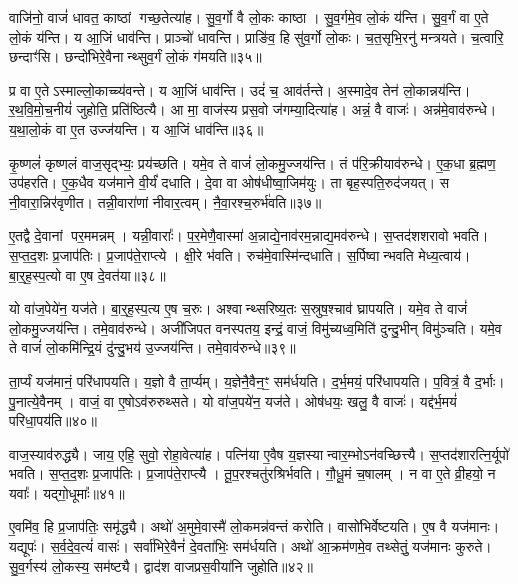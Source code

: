 वाजि॑नो॒ वाजं॑ धावत॒ काष्ठां गच्छ॒तेत्या॑ह।
सु॒व॒र्गो वै लो॒कः काष्ठा।
सु॒व॒र्गमे॒व लो॒कं य॑न्ति।
सु॒व॒र्गं वा ए॒ते लो॒कं य॑न्ति।
य आ॒जिं धाव॑न्ति।
प्राञ्चो॑ धावन्ति।
प्राङि॑व॒ हि सु॑व॒र्गो लो॒कः।
च॒त॒सृभि॒रनु॑ मन्त्रयते।
च॒त्वारि॒ छन्दाꣳ॑सि।
छन्दो॑भिरे॒वैनान्थ्सुव॒र्गं लो॒कं ग॑मयति॥३५॥

प्र वा ए॒ते\-ऽस्माल्लो॒काच्च्य॑वन्ते।
य आ॒जिं धाव॑न्ति।
उदं॑ च॒ आव॑र्तन्ते।
अ॒स्मादे॒व तेन॑ लो॒कान्नय॑न्ति।
र॒थ॒वि॒मो॒च॒नीयं॑ जुहोति॒ प्रति॑ष्ठित्यै।
आ मा॒ वाज॑स्य प्रस॒वो ज॑गम्या॒दित्या॑ह।
अन्नं॒ वै वाजः॑।
अन्न॑मे॒वाव॑रुन्धे।
य॒था॒लो॒कं वा ए॒त उज्ज॑यन्ति।
य आ॒जिं धाव॑न्ति॥३६॥

कृ॒ष्णलं॑ कृष्णलं वाज॒सृद्भ्यः॒ प्रय॑च्छति।
यमे॒व ते वाजं॑ लो॒कमु॒ज्जय॑न्ति।
तं प॑रि॒क्रीयाव॑रुन्धे।
ए॒क॒धा ब्र॒ह्मण॒ उप॑हरति।
ए॒क॒धैव यज॑माने वी॒र्यं॑ दधाति।
दे॒वा वा ओष॑धीष्वा॒जिम॑युः।
ता बृह॒स्पति॒रुद॑जयत्।
स नी॒वारा॒न्निर॑वृणीत।
तन्नी॒वारा॑णां नीवार॒त्वम्।
नै॒वा॒रश्च॒रुर्भ॑वति॥३७॥

ए॒तद्वै दे॒वानां पर॒ममन्नम्।
यन्नी॒वाराः᳚।
प॒र॒मेणै॒वास्मा॑ अ॒न्नाद्ये॒नाव॑रम॒न्नाद्य॒मव॑रुन्धे।
स॒प्तद॑शशरावो भवति।
स॒प्त॒द॒शः प्र॒जाप॑तिः।
प्र॒जाप॑ते॒राप्त्ये।
क्षी॒रे भ॑वति।
रुच॑मे॒वास्मि॑न्दधाति।
स॒र्पिष्वान्भवति मेध्य॒त्वाय॑।
बा॒र्॒ह॒स्प॒त्यो वा ए॒ष दे॒वत॑या॥३८॥

यो वा॑ज॒पेये॑न॒ यज॑ते।
बा॒र्॒ह॒स्प॒त्य ए॒ष च॒रुः।
अश्वान्थ्सरिष्य॒तः स॒स्रुष॒श्चाव॑ घ्रापयति।
यमे॒व ते वाजं॑ लो॒कमु॒ज्जय॑न्ति।
तमे॒वाव॑रुन्धे।
अजी॑जिपत वनस्पतय॒ इन्द्रं॒ वाजं॒ विमु॑च्यध्व॒मिति॑ दुन्दु॒भीन् विमु॑ञ्चति।
यमे॒व ते वाजं॑ लो॒कमि॑न्द्रि॒यं दु॑न्दु॒भय॑ उ॒ज्जय॑न्ति।
तमे॒वाव॑रुन्धे॥३९॥

ता॒र्प्यं यज॑मानं॒ परि॑धापयति।
य॒ज्ञो वै ता॒र्प्यम्।
य॒ज्ञेनै॒वैन॒ꣳ॒ सम॑र्धयति।
द॒र्भ॒मयं॒ परि॑धापयति।
प॒वित्रं॒ वै द॒र्भाः।
पु॒नात्ये॒वैनम्।
वाजं॒ वा ए॒षो\-ऽव॑रुरुथ्सते।
यो वा॑ज॒पये॑न॒ यज॑ते।
ओष॑धयः॒ खलु॒ वै वाजः॑।
यद्द॑र्भ॒मयं॑ परिधा॒पय॑ति॥४०॥

वाज॒स्याव॑रुद्ध्यै।
जाय॒ एहि॒ सुवो॒ रोहा॒वेत्या॑ह।
पत्नि॑या ए॒वैष य॒ज्ञस्यान्वार॒म्भो\-ऽन॑वच्छित्त्यै।
स॒प्तद॑शारत्नि॒र्यूपो॑ भवति।
स॒प्त॒द॒शः प्र॒जाप॑तिः।
प्र॒जाप॑ते॒राप्त्यै।
तू॒प॒रश्चतु॑रश्रिर्भवति।
गौ॒धू॒मं च॒षालम्।
न वा ए॒ते व्री॒हयो॒ न यवाः᳚।
यद्गो॒धूमाः᳚॥४१॥

ए॒वमि॑व॒ हि प्र॒जाप॑तिः॒ समृ॑द्ध्यै।
अथो॑ अ॒मुमे॒वास्मै॑ लो॒कमन्न॑वन्तं करोति।
वासो॑भिर्वेष्टयति।
ए॒ष वै यज॑मानः।
यद्यूपः॑।
स॒र्व॒दे॒व॒त्यं॑ वासः॑।
सर्वा॑भिरे॒वैनं॑ दे॒वता॑भिः॒ सम॑र्धयति।
अथो॑ आ॒क्रम॑णमे॒व तथ्सेतुं॒ यज॑मानः कुरुते।
सु॒व॒र्गस्य॑ लो॒कस्य॒ सम॑ष्ट्यै।
द्वाद॑श वाजप्रस॒वीया॑नि जुहोति॥४२॥

